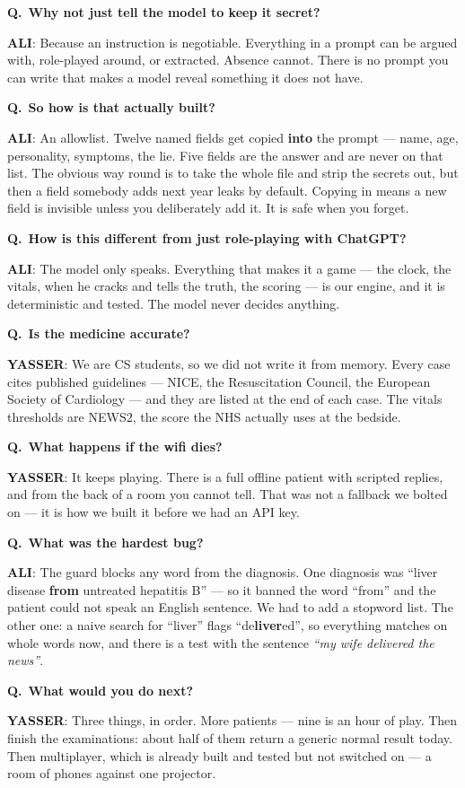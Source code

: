 \documentclass[11pt,a4paper]{article}
\newcommand{\Y}{\textcolor{mintdeep}{\textbf{YASSER}}}
\newcommand{\A}{\textcolor{peridp}{\textbf{ALI}}}
\newcommand{\say}[1]{\textit{``#1''}}
\newcommand{\qa}[2]{%
  \par\smallskip\noindent\textbf{\textcolor{peridp}{Q.}}~\textbf{#1}\par
  \noindent\hspace{4.4mm}\begin{minipage}{0.95\linewidth}#2\end{minipage}\par\smallskip}
\begin{document}
\qa{Why not just tell the model to keep it secret?}{%
\A: Because an instruction is negotiable. Everything in a prompt can be argued with,
role-played around, or extracted. Absence cannot. There is no prompt you can write
that makes a model reveal something it does not have.}

\qa{So how is that actually built?}{%
\A: An allowlist. Twelve named fields get copied \textbf{into} the prompt --- name, age,
personality, symptoms, the lie. Five fields are the answer and are never on that list.
The obvious way round is to take the whole file and strip the secrets out, but then a
field somebody adds next year leaks by default. Copying in means a new field is invisible
unless you deliberately add it. It is safe when you forget.}

\qa{How is this different from just role-playing with ChatGPT?}{%
\A: The model only speaks. Everything that makes it a game --- the clock, the vitals,
when he cracks and tells the truth, the scoring --- is our engine, and it is deterministic
and tested. The model never decides anything.}

\qa{Is the medicine accurate?}{%
\Y: We are CS students, so we did not write it from memory. Every case cites published
guidelines --- NICE, the Resuscitation Council, the European Society of Cardiology --- and
they are listed at the end of each case. The vitals thresholds are NEWS2, the score the NHS
actually uses at the bedside.}

\qa{What happens if the wifi dies?}{%
\Y: It keeps playing. There is a full offline patient with scripted replies, and from the
back of a room you cannot tell. That was not a fallback we bolted on --- it is how we built
it before we had an API key.}

\qa{What was the hardest bug?}{%
\A: The guard blocks any word from the diagnosis. One diagnosis was ``liver disease
\textbf{from} untreated hepatitis B'' --- so it banned the word ``from'' and the patient could
not speak an English sentence. We had to add a stopword list. The other one: a naive search
for ``liver'' flags ``de\textbf{liver}ed'', so everything matches on whole words now, and there
is a test with the sentence \say{my wife delivered the news}.}

\qa{What would you do next?}{%
\Y: Three things, in order. More patients --- nine is an hour of play. Then finish the
examinations: about half of them return a generic normal result today. Then multiplayer, which
is already built and tested but not switched on --- a room of phones against one projector.}
\end{document}

